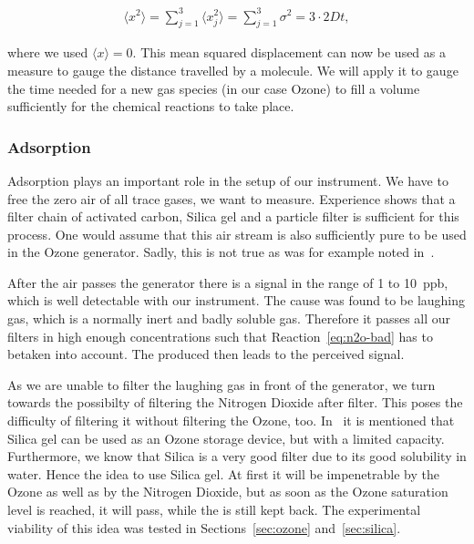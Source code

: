 \begin{align}
  \langle x^2 \rangle = \sum_{j=1}^3 \langle
  x_j^2 \rangle = \sum_{j=1}^3 \sigma^2 = 3 \cdot 2Dt, \label{eq:mqd}
\end{align}

where we used $\langle x \rangle = 0$. This mean squared displacement
can now be used as a measure to gauge the distance travelled by a
molecule. We will apply it to gauge the time needed for a new gas
species (in our case Ozone) to fill a volume sufficiently for the
chemical reactions to take place.

\subsubsection{Adsorption}
\label{sec:adsorption}

Adsorption plays an important role in the setup of our
instrument. We have to free the zero air of all trace gases, we want
to measure. Experience shows that a filter chain of activated carbon,
Silica gel and a particle filter is sufficient for this process. One
would assume that this air stream is also sufficiently pure to be used
in the Ozone generator. Sadly, this is not true as was for example
noted in~\cite{bsc}. 

After the air passes the generator there is a  signal in the
range of \num{1} to \SI{10}{ppb}, which is well detectable with our
instrument. The cause was found to be laughing gas, which is a normally
inert and badly soluble gas. Therefore it passes all our
filters in high enough concentrations such that
Reaction~\eqref{eq:n2o-bad} has to betaken into account. The produced
 then leads to the perceived  signal. 

As we are unable to filter the laughing gas in front of the generator,
we turn towards the possibilty of filtering the Nitrogen Dioxide after
filter. This poses the difficulty of filtering it without filtering
the Ozone, too. In~\cite{ozone-silica} it is mentioned that Silica gel
can be used as an Ozone storage device, but with a limited
capacity. Furthermore, we know that Silica is a very good 
filter due to its good solubility in water. Hence the idea to use
Silica gel. At first it will be impenetrable by the Ozone as well as by
the Nitrogen Dioxide, but as soon as the Ozone saturation level is
reached, it will pass, while the  is still kept back. The
experimental viability of this idea was tested in
Sections~\ref{sec:ozone} and~\ref{sec:silica}.


